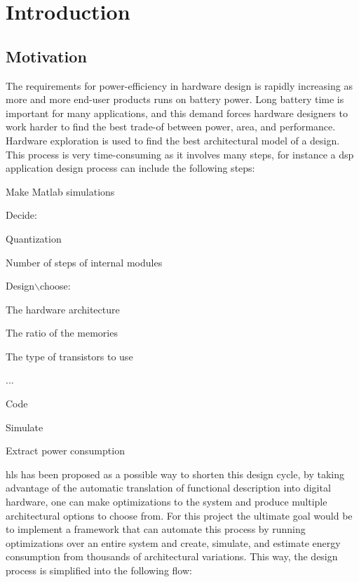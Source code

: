 \chapter{Introduction}
\label{chp:introduction} 
\section{\label{sec:motivation}Motivation}
The requirements for power-efficiency in hardware design is rapidly increasing as more and more end-user products runs on battery power. Long battery time is important for many applications, and this demand forces hardware designers to work harder to find the best trade-of between power, area, and performance. Hardware exploration is used to find the best architectural model of a design. This process is very time-consuming as it involves many steps, for instance a \gls{dsp} application design process can include the following steps:
\begin{compactenum}
    \item Make Matlab simulations 
    \item Decide:
    \begin{compactitem}
        \item Quantization
        \item Number of steps of internal modules
    \end{compactitem}
    \item Design$\backslash$choose:
    \begin{compactitem}
        \item The hardware architecture
        \item The ratio of the memories
        \item The type of transistors to use
    \end{compactitem}
    \item ...
    \item Code
    \item Simulate
    \item Extract power consumption
\end{compactenum}
\gls{hls} has been proposed as a possible way to shorten this design cycle, by taking advantage of the automatic translation of functional description into digital hardware, one can make optimizations to the system and produce multiple architectural options to choose from. For this project the ultimate goal would be to implement a framework that can automate this process by running optimizations over an entire system and create, simulate, and estimate energy consumption from thousands of architectural variations. This way, the design process is simplified into the following flow:
